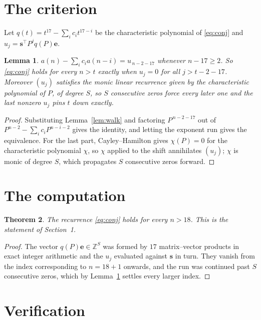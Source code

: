 \documentclass[11pt,a4paper]{article}
\theoremstyle{plain}
\newtheorem{theorem}{Theorem}
\newtheorem{lemma}[theorem]{Lemma}
\theoremstyle{definition}
\begin{document}
\section{The criterion}

Let $q(t)=t^{17}-\sum_i c_i t^{17-i}$ be the characteristic polynomial of
\eqref{eq:conj} and $u_j=\mathbf{s}^{\!\top}P^{j}q(P)\mathbf{e}$.

\begin{lemma}\label{lem:crit}
$a(n)-\sum_i c_i a(n-i)=u_{\,n-2-17}$ whenever $n-17\ge2$. So \eqref{eq:conj}
holds for every $n>t$ exactly when $u_j=0$ for all $j>t-2-17$. Moreover $(u_j)$
satisfies the monic linear recurrence given by the characteristic polynomial of $P$, of
degree $S$, so $S$ consecutive zeros force every later one and the last nonzero $u_j$ pins
$t$ down exactly.
\end{lemma}

\begin{proof}
Substituting Lemma~\ref{lem:walk} and factoring $P^{\,n-2-17}$ out of
$P^{n-2}-\sum_i c_i P^{n-i-2}$ gives the identity, and letting the exponent run gives the
equivalence. For the last part, Cayley--Hamilton gives $\chi(P)=0$ for the characteristic
polynomial $\chi$, so $\chi$ applied to the shift annihilates $(u_j)$; $\chi$ is monic of
degree $S$, which propagates $S$ consecutive zeros forward.
\end{proof}

\section{The computation}

\begin{theorem}
The recurrence \eqref{eq:conj} holds for every $n>18$. This is the statement of
Section~1.
\end{theorem}

\begin{proof}
The vector $q(P)\mathbf{e}\in\mathbb{Z}^{S}$ was formed by $17$ matrix--vector
products in exact integer arithmetic and the $u_j$ evaluated against $\mathbf{s}$ in turn.
They vanish from the index corresponding to $n=18+1$ onwards, and the run was continued
past $S$ consecutive zeros, which by Lemma~\ref{lem:crit} settles every larger index.
\end{proof}

\section{Verification}
\end{document}

